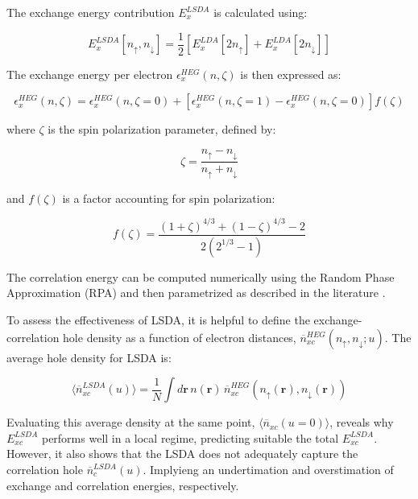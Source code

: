 The exchange energy contribution \(E_{x}^{LSDA}\) is calculated using:

\begin{equation}
	E_{x}^{LSDA} \left[ n_{\uparrow}, n_{\downarrow} \right] = \dfrac{1}{2} \left[ E_{x}^{LDA}[2n_{\uparrow}] + E_{x}^{LDA}[2n_{\downarrow}] \right]
\end{equation}

The exchange energy per electron \(\epsilon_{x}^{HEG}(n, \zeta)\) is then expressed as:

\begin{equation}
	\epsilon_{x}^{HEG}(n, \zeta) = \epsilon_{x}^{HEG} (n, \zeta = 0) + \left[ \epsilon_{x}^{HEG} (n, \zeta = 1) - \epsilon_{x}^{HEG}(n, \zeta=0) \right] f(\zeta)
\end{equation}

where \(\zeta\) is the spin polarization parameter, defined by:

\begin{equation}
	\zeta = \frac{n_{\uparrow} - n_{\downarrow}}{n_{\uparrow} + n_{\downarrow}}
\end{equation}

and \(f(\zeta)\) is a factor accounting for spin polarization:

\begin{equation}
	f(\zeta) = \frac{(1+\zeta)^{4/3} + (1-\zeta)^{4/3} - 2}{2(2^{1/3} - 1)}
\end{equation}

The correlation energy can be computed numerically using the Random Phase Approximation (RPA) and then parametrized as described in the literature \supercite{VonBarth1972, Vosko1980}.

To assess the effectiveness of LSDA, it is helpful to define the exchange-correlation hole density as a function of electron distances, \(\overline{n}_{xc}^{HEG}(n_{\uparrow}, n_{\downarrow}; u)\). The average hole density for LSDA is:

\begin{equation}
	\langle \overline{n}_{xc}^{LSDA}(u) \rangle = \dfrac{1}{N} \int d \mathbf{r} \, n(\mathbf{r}) \, \overline{n}_{xc}^{HEG} \left( n_{\uparrow}(\mathbf{r}), n_{\downarrow}(\mathbf{r}) \right)
\end{equation}

Evaluating this average density at the same point, \(\langle \overline{n}_{xc}(u=0) \rangle\), reveals why \(E_{xc}^{LSDA}\) performs well in a local regime, predicting suitable the total  $E_{xc}^{LSDA}$. However, it also shows that the LSDA does not adequately capture the correlation hole \(\overline{n}_c^{LSDA}(u)\). Implyieng an undertimation and overstimation of exchange and correlation energies, respectively.
